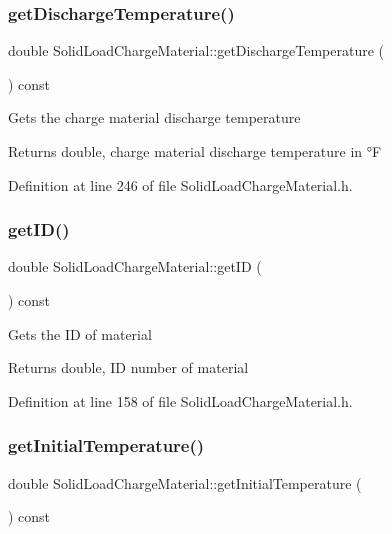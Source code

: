 \subsubsection{\texorpdfstring{get\+Discharge\+Temperature()}{getDischargeTemperature()}}
{\footnotesize\ttfamily double Solid\+Load\+Charge\+Material\+::get\+Discharge\+Temperature (\begin{DoxyParamCaption}{ }\end{DoxyParamCaption}) const\hspace{0.3cm}{\ttfamily [inline]}}

Gets the charge material discharge temperature \begin{DoxyReturn}{Returns}
double, charge material discharge temperature in °F 
\end{DoxyReturn}


Definition at line 246 of file Solid\+Load\+Charge\+Material.\+h.

\mbox{\label{class_solid_load_charge_material_ae34ce5c6f1f362340ead0748aaf885b8}} 
\subsubsection{\texorpdfstring{get\+I\+D()}{getID()}}
{\footnotesize\ttfamily double Solid\+Load\+Charge\+Material\+::get\+ID (\begin{DoxyParamCaption}{ }\end{DoxyParamCaption}) const\hspace{0.3cm}{\ttfamily [inline]}}

Gets the ID of material \begin{DoxyReturn}{Returns}
double, ID number of material 
\end{DoxyReturn}


Definition at line 158 of file Solid\+Load\+Charge\+Material.\+h.

\mbox{\label{class_solid_load_charge_material_ae5d7f198fb1d4a3adb0cfc911a13ea06}} 
\subsubsection{\texorpdfstring{get\+Initial\+Temperature()}{getInitialTemperature()}}
{\footnotesize\ttfamily double Solid\+Load\+Charge\+Material\+::get\+Initial\+Temperature (\begin{DoxyParamCaption}{ }\end{DoxyParamCaption}) const\hspace{0.3cm}{\ttfamily [inline]}}


